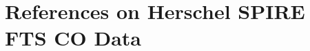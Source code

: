 \documentclass[11pt,a4paper]{article}
\begin{document}

\clearpage

\section{References on Herschel SPIRE FTS CO Data}
\label{Appendix_References_FTS_CO}


\clearpage

\end{document}
